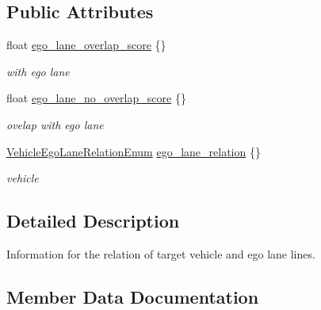 \subsection*{Public Attributes}
\begin{DoxyCompactItemize}
\item 
float \hyperlink{structmaf__perception__interface_1_1VehicleEgoLaneRelationInfo_a5a1eee01b1222329244eb036ee0308d6}{ego\+\_\+lane\+\_\+overlap\+\_\+score} \{\}
\begin{DoxyCompactList}\small\item\em with ego lane \end{DoxyCompactList}\item 
float \hyperlink{structmaf__perception__interface_1_1VehicleEgoLaneRelationInfo_a9fcf4cb7f9c964ca5f75ea45d65d851c}{ego\+\_\+lane\+\_\+no\+\_\+overlap\+\_\+score} \{\}
\begin{DoxyCompactList}\small\item\em ovelap with ego lane \end{DoxyCompactList}\item 
\hyperlink{structmaf__perception__interface_1_1VehicleEgoLaneRelationEnum}{Vehicle\+Ego\+Lane\+Relation\+Enum} \hyperlink{structmaf__perception__interface_1_1VehicleEgoLaneRelationInfo_a01c6ed4e8ba5862836eecd4686a1dd1d}{ego\+\_\+lane\+\_\+relation} \{\}
\begin{DoxyCompactList}\small\item\em vehicle \end{DoxyCompactList}\end{DoxyCompactItemize}


\subsection{Detailed Description}
Information for the relation of target vehicle and ego lane lines. 

\subsection{Member Data Documentation}
\mbox{\label{structmaf__perception__interface_1_1VehicleEgoLaneRelationInfo_a9fcf4cb7f9c964ca5f75ea45d65d851c}} 
